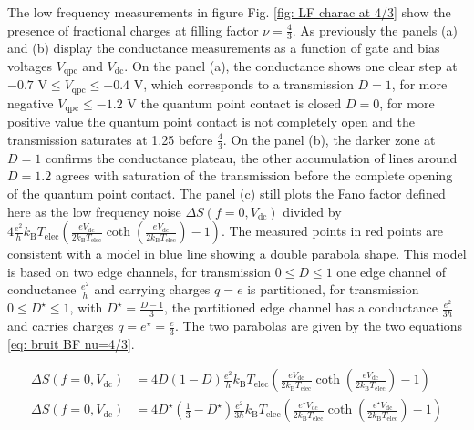 The low frequency measurements in figure Fig. \ref{fig: LF charac at 4/3} show the presence of fractional charges at filling factor $\nu = \frac{4}{3}$.
As previously the panels (a) and (b) display the conductance measurements as a function of gate and bias voltages $V_{\mathrm{qpc}}$ and $V_{\mathrm{dc}}$.
On the panel (a), the conductance shows one clear step at $-0.7$ V$\leq V_{\mathrm{qpc}}\leq -0.4$ V, which corresponds to a transmission $D = 1$, for more negative $V_{\mathrm{qpc}}\leq -1.2$ V the quantum point contact is closed $D = 0$, for more positive value the quantum point contact is not completely open and the transmission saturates at 1.25 before $\frac{4}{3}$.
On the panel (b), the darker zone at $D = 1$ confirms the conductance plateau, the other accumulation of lines around  $D = 1.2$ agrees with saturation of the transmission before the complete opening of the quantum point contact.
The panel (c) still plots the Fano factor defined here as the low frequency noise $\Delta S\left(f=0,V_{\mathrm{dc}}\right)$ divided by $4\frac{e^{2}}{h}k_{\mathrm{B}}T_{\mathrm{elec}}\left(\frac{eV_{\mathrm{dc}}}{2k_{\mathrm{B}}T_{\mathrm{elec}}}\coth\left(\frac{eV_{\mathrm{dc}}}{2k_{\mathrm{B}}T_{\mathrm{elec}}}\right)-1\right)$.
The measured points in red points are consistent with a model in blue line showing a double parabola shape.
This model is based on two edge channels, for transmission $0 \leq D \leq 1$ one edge channel of conductance $\frac{e^{2}}{h}$ and carrying charges $q = e$ is partitioned, for transmission $0 \leq D^{\star} \leq 1$, with $D^{\star} = \frac{D-1}{3}$, the partitioned edge channel has a conductance $\frac{e^{2}}{3h}$ and carries charges $q = e^{\star} = \frac{e}{3}$.
The two parabolas are given by the two equations \eqref{eq: bruit BF nu=4/3}.

\begin{align}
\Delta S\left(f=0,V_{\mathrm{dc}}\right) &= 4D\left(1-D\right)\frac{e^{2}}{h}k_{\mathrm{B}}T_{\mathrm{elec}}\left(\frac{eV_{\mathrm{dc}}}{2k_{\mathrm{B}}T_{\mathrm{elec}}}\coth\left(\frac{eV_{\mathrm{dc}}}{2k_{\mathrm{B}}T_{\mathrm{elec}}}\right)-1\right) \\
\Delta S\left(f=0,V_{\mathrm{dc}}\right) &= 4D^{\star}\left(\frac{1}{3}-D^{\star}\right)\frac{e^{2}}{3h}k_{\mathrm{B}}T_{\mathrm{elec}}\left(\frac{e^{\star}V_{\mathrm{dc}}}{2k_{\mathrm{B}}T_{\mathrm{elec}}}\coth\left(\frac{e^{\star}V_{\mathrm{dc}}}{2k_{\mathrm{B}}T_{\mathrm{elec}}}\right)-1\right)
\label{eq: bruit BF nu=4/3}	
\end{align}

